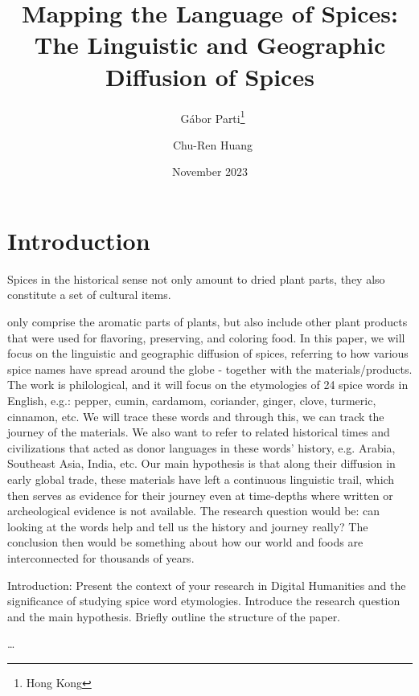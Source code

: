 \documentclass{dsh} %
\title{Mapping the Language of Spices: The Linguistic and Geographic Diffusion of Spices}
\author[1]{\orcid{0000-0003-2042-4655}~Gábor Parti\footnote{Hong Kong}}
\author[2]{\orcid{0000-0002-8526-5520}~Chu-Ren Huang}
\affil[1,2]{The Hong Kong Polytechnic University}
\date{\small{November 2023}}
\begin{document}
\maketitle

\begin{abstract}
\end{abstract}


\section{Introduction}

Spices in the historical sense not only amount to dried plant parts, they also constitute a set of cultural items. 






only comprise the aromatic parts of plants, but also include other plant products that were used for flavoring, preserving, and coloring food. In this paper, we will focus on the linguistic and geographic diffusion of spices, referring to how various spice names have spread around the globe - together with the materials/products. The work is philological, and it will focus on the etymologies of 24 spice words in English, e.g.: pepper, cumin, cardamom, coriander, ginger, clove, turmeric, cinnamon, etc. We will trace these words and through this, we can track the journey of the materials. We also want to refer to related historical times and civilizations that acted as donor languages in these words' history, e.g. Arabia, Southeast Asia, India, etc. Our main hypothesis is that along their diffusion in early global trade, these materials have left a continuous linguistic trail, which then serves as evidence for their journey even at time-depths where written or archeological evidence is not available. The research question would be: can looking at the words help and tell us the history and journey really? The conclusion then would be something about how our world and foods are interconnected for thousands of years.







Introduction:
Present the context of your research in Digital Humanities and the significance of studying spice word etymologies.
Introduce the research question and the main hypothesis.
Briefly outline the structure of the paper.

\dots
\end{document}
